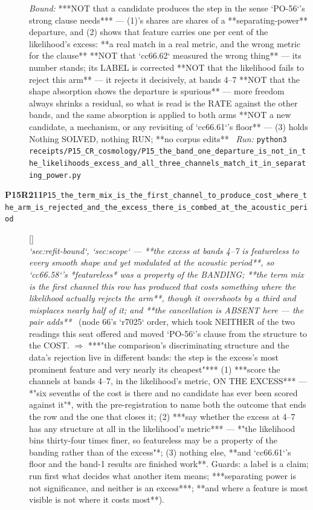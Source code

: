 \begin{description}
 \emph{Bound:}  ***NOT that a candidate produces the step in the sense `PO-56`'s strong clause needs*** --- (1)'s shares are shares of a **separating-power** departure, and (2) shows that feature carries one per cent of the likelihood's excess: **a real match in a real metric, and the wrong metric for the clause**  **NOT that `cc66.62` measured the wrong thing** --- its number stands; its LABEL is corrected  **NOT that the likelihood fails to reject this arm** --- it rejects it decisively, at bands 4--7  **NOT that the shape absorption shows the departure is spurious** --- more freedom always shrinks a residual, so what is read is the RATE against the other bands, and the same absorption is applied to both arms  **NOT a new candidate, a mechanism, or any revisiting of `cc66.61`'s floor** --- (3) holds  Nothing SOLVED, nothing RUN; **no corpus edits**
\ \emph{Run:} \texttt{python3 receipts/P15\_CR\_cosmology/P15\_the\_band\_one\_departure\_is\_not\_in\_the\_likelihoods\_excess\_and\_all\_three\_channels\_match\_it\_in\_separating\_power.py}
\item[\rcptlabel{P15_the_term_mix_is_the_first_channel_to_produce_cost_where_the_arm_is_rejected_and_the_excess_there_is_combed_at_the_acoustic_period}{P15R211}\textbf{P15R211}\quad\texttt{P15\_the\_term\_mix\_is\_the\_first\_channel\_to\_produce\_cost\_where\_the\_arm\_is\_rejected\_and\_the\_excess\_there\_is\_combed\_at\_the\_acoustic\_period}]\hfill\textsf{[]}\\
\textit{`sec:refit-bound`, `sec:scope` --- **the excess at bands 4--7 is featureless to every smooth shape and yet modulated at the acoustic period**, so `cc66.58`'s *featureless* was a property of the BANDING; **the term mix is the first channel this row has produced that costs something where the likelihood actually rejects the arm**, though it overshoots by a third and misplaces nearly half of it; and **the cancellation is ABSENT here --- the pair adds**} \ (node 66's `r7025` order, which took NEITHER of the two readings this seat offered and moved `PO-56`'s clause from the structure to the COST. \ensuremath{\Rightarrow} ***"the comparison's discriminating structure and the data's rejection live in different bands: the step is the excess's most prominent feature and very nearly its cheapest"***  (1) ***score the channels at bands 4--7, in the likelihood's metric, ON THE EXCESS*** --- *"six sevenths of the cost is there and no candidate has ever been scored against it"*, with the pre-registration to name both the outcome that ends the row and the one that closes it; (2) ***say whether the excess at 4--7 has any structure at all in the likelihood's metric*** --- *"the likelihood bins thirty-four times finer, so featureless may be a property of the banding rather than of the excess"*; (3) nothing else, **and `cc66.61`'s floor and the band-1 results are finished work**.  Guards: a label is a claim; run first what decides what another item means; ***separating power is not significance, and neither is an excess***; **and where a feature is most visible is not where it costs most**). 

\end{description}

